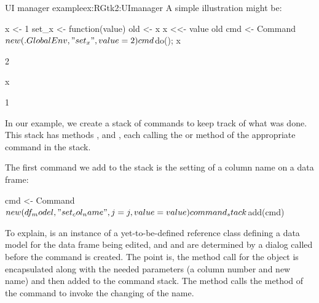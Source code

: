 \begin{example}{UI manager example}{ex:RGtk2:UImanager}
A simple illustration might be:
\begin{Schunk}
\begin{Sinput}
 x <- 1
 set_x <- function(value) {
   old <- x
   x <<- value
   old
 }
 cmd <- Command$new(.GlobalEnv, "set_x", value = 2)
 cmd$do(); x
\end{Sinput}
\begin{Soutput}
[1] 2
\end{Soutput}
\end{Schunk}
\begin{Schunk}
\end{Schunk}
\begin{Schunk}
\begin{Sinput}
 x
\end{Sinput}
\begin{Soutput}
[1] 1
\end{Soutput}
\end{Schunk}

In our example, we create a stack of commands to keep track of what
was done. This stack has methods ,  and
, each calling the  or  method of the
appropriate command in the stack.

The first command we add to the stack is the setting of a column name
on a data frame:
\begin{Schunk}
\begin{Sinput}
 cmd <- Command$new(df_model, "set_col_name", j = j, value = value)
 command_stack$add(cmd)
\end{Sinput}
\end{Schunk}
%
To explain,  is an instance of a yet-to-be-defined
reference class defining a data model for the data frame being edited,
and  and  are determined by a dialog called before
the command is created. The point is, the method call for the
 object is encapsulated along with the needed
parameters (a column number and new name) and then added to the
command stack. The  method calls the  method of the
command to invoke the changing of the name.


\end{example}
